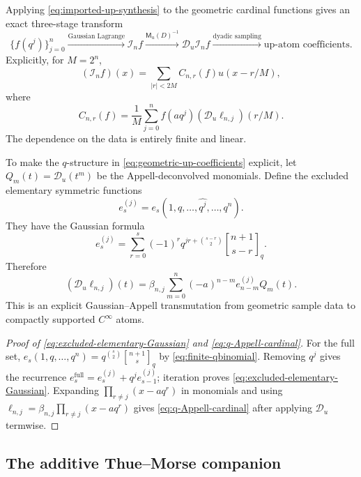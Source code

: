 \documentclass[11pt,a4paper,oneside]{article}
\theoremstyle{definition}
\theoremstyle{remark}
\newcommand{\Iop}{\mathcal I}
\newcommand{\qbinom}[3]{\genfrac{[}{]}{0pt}{}{#1}{#2}_{#3}}
\begin{document}
Applying \eqref{eq:imported-up-synthesis} to the geometric cardinal functions
gives an exact three-stage transform
\[
 \{f(q^j)\}_{j=0}^n
 \xrightarrow{\text{Gaussian Lagrange}}
 \Iop_nf
 \xrightarrow{\mathsf M_u(D)^{-1}}
 \mathscr D_u\Iop_nf
 \xrightarrow{\text{dyadic sampling}}
 \text{up-atom coefficients}.
\]
Explicitly, for $M=2^n$,
\begin{equation}
 (\Iop_nf)(x)=\sum_{|r|<2M}C_{n,r}(f)u(x-r/M),
 \label{eq:geometric-up-synthesis}
\end{equation}
where
\begin{equation}
 C_{n,r}(f)=\frac1M\sum_{j=0}^n
 f(aq^j)(\mathscr D_u\ell_{n,j})(r/M).
 \label{eq:geometric-up-coefficients}
\end{equation}
The dependence on the data is entirely finite and linear.

To make the $q$-structure in \eqref{eq:geometric-up-coefficients} explicit,
let $Q_m(t)=\mathscr D_u(t^m)$ be the Appell-deconvolved monomials.  Define the
excluded elementary symmetric functions
\begin{equation}
 e_s^{(j)}=e_s(1,q,\ldots,\widehat{q^j},\ldots,q^n).
 \label{eq:excluded-elementary}
\end{equation}
They have the Gaussian formula
\begin{equation}
 e_s^{(j)}=
 \sum_{r=0}^s(-1)^rq^{jr+\binom{s-r}{2}}
 \qbinom{n+1}{s-r}q.
 \label{eq:excluded-elementary-Gaussian}
\end{equation}
Therefore
\begin{equation}
 (\mathscr D_u\ell_{n,j})(t)
 =\beta_{n,j}
 \sum_{m=0}^n(-a)^{n-m}e_{n-m}^{(j)}Q_m(t).
 \label{eq:q-Appell-cardinal}
\end{equation}
This is an explicit Gaussian--Appell transmutation from geometric sample data
to compactly supported $C^\infty$ atoms.

\begin{proof}[Proof of \eqref{eq:excluded-elementary-Gaussian} and
\eqref{eq:q-Appell-cardinal}]
For the full set,
$e_s(1,q,\ldots,q^n)=q^{\binom s2}\qbinom{n+1}{s}q$ by
\eqref{eq:finite-qbinomial}.  Removing $q^j$ gives the recurrence
$e_s^{\mathrm{full}}=e_s^{(j)}+q^je_{s-1}^{(j)}$; iteration proves
\eqref{eq:excluded-elementary-Gaussian}.  Expanding
$\prod_{r\ne j}(x-aq^r)$ in monomials and using
$\ell_{n,j}=\beta_{n,j}\prod_{r\ne j}(x-aq^r)$ gives
\eqref{eq:q-Appell-cardinal} after applying $\mathscr D_u$ termwise.
\end{proof}

\subsection{The additive Thue--Morse companion}
\end{document}
